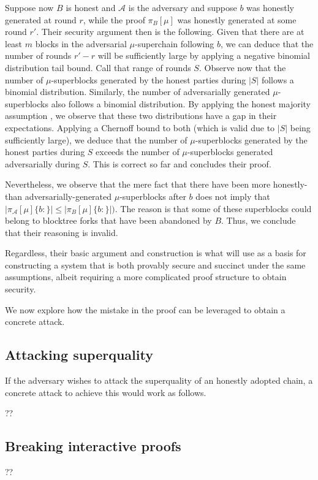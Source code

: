 Suppose now $B$ is honest and $\mathcal{A}$ is the adversary and suppose $b$ was
honestly generated at round $r$, while the proof $\pi_B[\mu]$ was honestly
generated at some round $r'$. Their security argument then is the following.
Given that there are at least $m$ blocks in the adversarial $\mu$-superchain
following $b$, we can deduce that the number of rounds $r' - r$ will be
sufficiently large by applying a negative binomial distribution tail bound. Call
that range of rounds $S$. Observe now that the number of $\mu$-superblocks
generated by the honest parties during $|S|$ follows a binomial distribution.
Similarly, the number of adversarially generated $\mu$-superblocks also follows
a binomial distribution. By applying the honest majority assumption
\cite{backbone}, we observe that these two distributions have a gap in their
expectations. Applying a Chernoff bound to both (which is valid due to $|S|$
being sufficiently large), we deduce that the number of $\mu$-superblocks
generated by the honest parties during $S$ exceeds the number of
$\mu$-superblocks generated adversarially during $S$. This is correct so far and
concludes their proof.

Nevertheless, we observe that the mere fact that there have been more honestly-
than adversarially-generated $\mu$-superblocks after $b$ does not imply that
$|\pi_\mathcal{A}[\mu]\{b:\}| \leq |\pi_B[\mu]\{b:\}|)$. The reason is that some
of these superblocks could belong to blocktree forks that have been abandoned by
$B$. Thus, we conclude that their reasoning is invalid.

Regardless, their basic argument and construction is what will use as a basis
for constructing a system that is both provably secure and succinct under the
same assumptions, albeit requiring a more complicated proof structure to obtain
security.

We now explore how the mistake in the proof can be leveraged to obtain a concrete attack.

\subsection{Attacking superquality}

If the adversary wishes to attack the superquality of an honestly adopted chain,
a concrete attack to achieve this would work as follows.

??

\subsection{Breaking interactive proofs}

??
